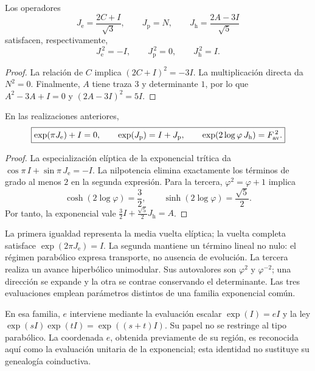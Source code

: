 \begin{proposition}
\label{euler-trit-generadores}
Los operadores
\[
 J_{\mathrm e}=\frac{2C+I}{\sqrt3},\qquad
 J_{\mathrm p}=N,\qquad
 J_{\mathrm h}=\frac{2A-3I}{\sqrt5}
\]
satisfacen, respectivamente,
\[
 J_{\mathrm e}^{\,2}=-I,\qquad
 J_{\mathrm p}^{\,2}=0,\qquad
 J_{\mathrm h}^{\,2}=I.
\]
\end{proposition}
\begin{proof}
La relación de \(C\) implica \((2C+I)^2=-3I\).
La multiplicación directa da \(N^2=0\).
Finalmente, \(A\) tiene traza \(3\) y determinante \(1\), por lo que
\(A^2-3A+I=0\) y \((2A-3I)^2=5I\).
\end{proof}

\begin{proposition}
\label{euler-trit-evaluaciones}
En las realizaciones anteriores,
\begin{equation}
 \boxed{
 \exp(\pi J_{\mathrm e})+I=0,\qquad
 \exp(J_{\mathrm p})=I+J_{\mathrm p},\qquad
 \exp(2\log\varphi\,J_{\mathrm h})=F_{\rm av}^{\,2}.}
 \label{euler-trit-tres-evaluaciones}
\end{equation}
\end{proposition}
\begin{proof}
La especialización elíptica de la exponencial trítica da
\(\cos\pi\,I+\sin\pi\,J_{\mathrm e}=-I\).
La nilpotencia elimina exactamente los términos de grado al menos \(2\)
en la segunda expresión. Para la tercera, \(\varphi^2=\varphi+1\) implica
\[
 \cosh(2\log\varphi)=\frac32,\qquad
 \sinh(2\log\varphi)=\frac{\sqrt5}{2}.
\]
Por tanto, la exponencial vale
\(\frac32I+\frac{\sqrt5}{2}J_{\mathrm h}=A\).
\end{proof}

La primera igualdad representa la media vuelta elíptica; la vuelta completa
satisface \(\exp(2\pi J_{\mathrm e})=I\). La segunda mantiene un término
lineal no nulo: el régimen parabólico expresa transporte, no ausencia de
evolución. La tercera realiza un avance hiperbólico unimodular. Sus
autovalores son \(\varphi^2\) y \(\varphi^{-2}\); una dirección se expande y
la otra se contrae conservando el determinante. Las tres evaluaciones
emplean parámetros distintos de una familia exponencial común.

En esa familia, \(e\) interviene mediante la evaluación escalar
\(\exp(I)=eI\) y la ley \(\exp(sI)\exp(tI)=\exp((s+t)I)\).
Su papel no se restringe al tipo parabólico. La coordenada \(e\), obtenida
previamente de su región, es reconocida aquí como la evaluación unitaria
de la exponencial; esta identidad no sustituye su genealogía coinductiva.

